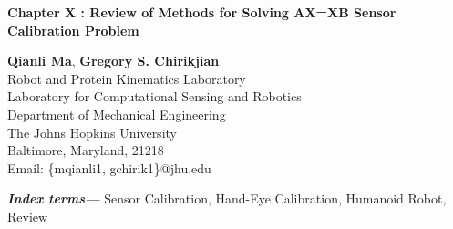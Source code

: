 \documentclass{llncs}
\providecommand{\keywords}[1]{\textbf{\textit{Index terms---}} #1}
\def\title#1{{\noindent\Large{\bf #1}\par}}
\def\author#1{\begin{center}{\sc #1\par}\end{center}}
\begin{document}
\pagestyle{empty}

\title{Chapter X : Review of Methods for Solving AX=XB Sensor Calibration Problem}
\author{\textbf{Qianli Ma},  \textbf{Gregory S. Chirikjian}\\
   {
	Robot and Protein Kinematics Laboratory\\
	Laboratory for Computational Sensing and Robotics\\
	Department of Mechanical Engineering\\
	The Johns Hopkins University\\
	Baltimore, Maryland, 21218\\
    Email: \{mqianli1, gchirik1\}@jhu.edu
    }	
}

\begin{abstract}
{\it
An often used formulation of sensor calibration in robotics and computer vision is ``AX=XB'', where $A$, $X$, and $B$ are rigid-body motions with $A$ and $B$ given from sensor measurements, and $X$ is the unknown calibration parameter. Many methods have been proposed to solve $X$ given data streams of $A$ and $B$ under different scenarios. This chapter presents the most complete picture of the $AX=XB$ solvers up to date.  Firstly, a brief overview of the various important sensor calibration techniques is given and problems of interest are highlighted. Then a detailed review on the various ``AX=XB'' research algorithms is presented. The notations of the selected algorithms are unified to the largest extent in order to show the interconnections between the selected methods in a straightforward  way. Next, the criterion for data selection and various error metrics are introduced, which are of critical importance for evaluating the performance of $AX=XB$ solvers. After that, numerical comparison are performed among the most important algorithms. At the end, both the advantages and disadvantages of the reviewed methods are summarized.
}
\end{abstract}

\keywords{Sensor Calibration, Hand-Eye Calibration, Humanoid Robot, Review}

\end{document}
